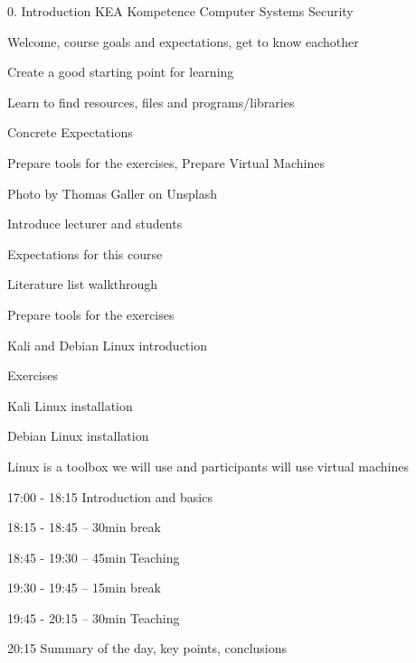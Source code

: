 \documentclass[Screen16to9,17pt]{foils}
\begin{document}
\mytitlepage
{0. Introduction}
{KEA Kompetence Computer Systems Security \the\year}

\hlkprofiluk




\begin{list2}
\item Welcome, course goals and expectations, get to know eachother
\item Create a good starting point for learning
\item Learn to find resources, files and programs/libraries
\item Concrete Expectations
\item Prepare tools for the exercises, Prepare Virtual Machines
\end{list2}

{\small\hfill{\small\hfill  Photo by Thomas Galler on Unsplash}}



\begin{list2}
\item Introduce lecturer and students
\item Expectations for this course
\item Literature list walkthrough
\item Prepare tools for the exercises
\item Kali and Debian Linux introduction
\end{list2}

Exercises
\begin{list2}
\item Kali Linux installation
\item Debian Linux installation
\end{list2}
Linux is a toolbox we will use and participants will use virtual machines



\begin{list1}
\item 17:00 - 18:15
Introduction and basics
\item 18:15 - 18:45 -- 30min break
\item 18:45 - 19:30 -- 45min Teaching
\item 19:30 - 19:45 -- 15min break
\item 19:45 - 20:15 -- 30min Teaching
\item 20:15 Summary of the day, key points, conclusions
\end{list1}
\end{document}
